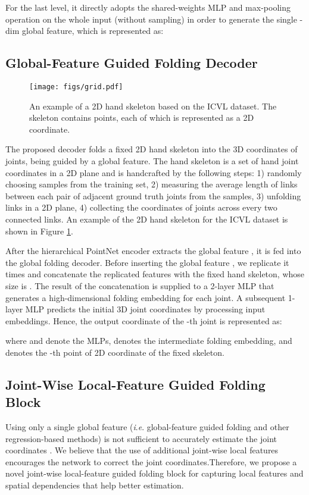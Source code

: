 \documentclass[10pt,twocolumn,letterpaper]{article}
\begin{document}
For the last level, it directly adopts the shared-weights MLP and max-pooling operation on the whole input (without sampling) in order to generate the single -dim global feature, which is represented as:





\subsection{Global-Feature Guided Folding Decoder}

\begin{figure}
\centering
\texttt{[image: figs/grid.pdf]}
\caption{An example of a 2D hand skeleton based on the ICVL dataset. The skeleton contains  points, each of which is represented as a 2D coordinate.}
\label{fig:grid}
\end{figure}

The proposed decoder folds a fixed 2D hand skeleton into the 3D coordinates of joints, being guided by a global feature. The hand skeleton is a set of hand joint coordinates in a 2D plane and is handcrafted by the following steps: 1) randomly choosing samples from the training set, 2) measuring the average length of links between each pair of adjacent ground truth joints from the samples, 3) unfolding links in a 2D plane, 4) collecting the coordinates of joints across every two connected links. An example of the 2D hand skeleton for the ICVL dataset is shown in Figure \ref{fig:grid}. 

After the hierarchical PointNet encoder extracts the global feature , it is fed into the global folding decoder. Before inserting the global feature , we replicate it  times and concatenate the replicated features with the fixed hand skeleton, whose size is . The result of the concatenation is supplied to a 2-layer MLP that generates a high-dimensional folding embedding  for each joint. A subsequent 1-layer MLP predicts the initial 3D joint coordinates by processing input embeddings. Hence, the output coordinate  of the -th joint is represented as:
 
where  and  denote the MLPs,  denotes the intermediate folding embedding, and  denotes the -th point of 2D coordinate of the fixed skeleton.








\subsection{Joint-Wise Local-Feature Guided Folding Block}
Using only a single global feature (\textit{i}.\textit{e}. global-feature guided folding and other regression-based methods) is not sufficient to accurately estimate the joint coordinates . We believe that the use of additional joint-wise local features encourages the network to correct the joint coordinates.Therefore, we propose a novel joint-wise local-feature guided folding block for capturing local features and spatial dependencies that help better estimation.
\end{document}

